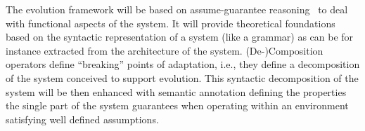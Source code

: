 \documentclass[12pt]{article}
\begin{document}
The evolution framework will be based on assume-guarantee reasoning~\cite{Pnueli1989} to deal with functional aspects of the system. It will provide theoretical foundations based on the syntactic representation of a system (like a grammar) as can be for instance extracted from the architecture of the system. (De-)Composition operators define ``breaking'' points of adaptation, i.e., they define a decomposition of the system conceived to support evolution. This syntactic decomposition of the system will be then enhanced with semantic annotation defining the properties the single part of the system guarantees when operating within an environment satisfying well defined assumptions.

%
%
\end{document}
